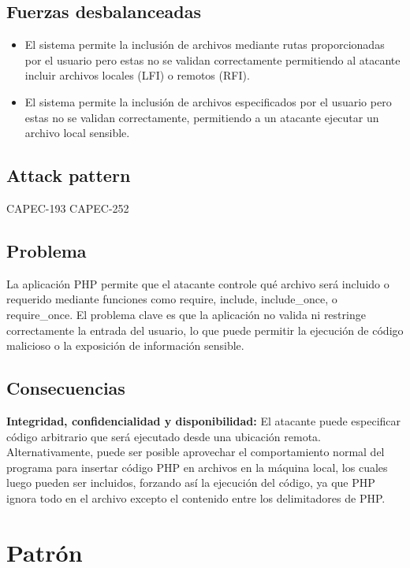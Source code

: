 \subsection*{Fuerzas desbalanceadas}

\begin{itemize}
    \item El sistema permite la inclusión de archivos mediante rutas proporcionadas por el usuario pero estas no se validan correctamente permitiendo al atacante incluir archivos locales (LFI) o remotos (RFI).
    \item El sistema permite la inclusión de archivos especificados por el usuario pero estas no se validan correctamente, permitiendo a un atacante ejecutar un archivo local sensible.
\end{itemize}

\subsection*{Attack pattern}

CAPEC-193
CAPEC-252

\subsection*{Problema}
La aplicación PHP permite que el atacante controle qué archivo será incluido o requerido mediante funciones como require, include, include\_once, o require\_once. El problema clave es que la aplicación no valida ni restringe correctamente la entrada del usuario, lo que puede permitir la ejecución de código malicioso o la exposición de información sensible.
\subsection*{Consecuencias}
\textbf{Integridad, confidencialidad y disponibilidad:} El atacante puede especificar código arbitrario que será ejecutado desde una ubicación remota. Alternativamente, puede ser posible aprovechar el comportamiento normal del programa para insertar código PHP en archivos en la máquina local, los cuales luego pueden ser incluidos, forzando así la ejecución del código, ya que PHP ignora todo en el archivo excepto el contenido entre los delimitadores de PHP.

\section{Patrón}

